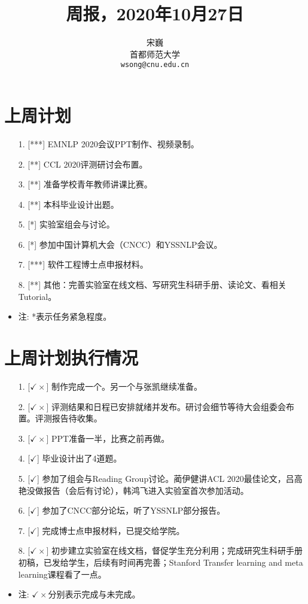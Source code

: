 \documentclass[11pt]{article}
\title{周报，2020年10月27日}
\author{宋巍 \\
  首都师范大学 \\
    {\tt wsong@cnu.edu.cn}}
\date{}
\begin{document}
\begin{CJK}{UTF8}{gkai}

\maketitle
\CJKindent


\section{上周计划}


\begin{itemize}
\item [1.] [***] EMNLP 2020会议PPT制作、视频录制。
\item [2.] [**] CCL 2020评测研讨会布置。
\item [3.] [**] 准备学校青年教师讲课比赛。
\item [4.] [**] 本科毕业设计出题。
\item [5.] [*] 实验室组会与讨论。
\item [6.] [*] 参加中国计算机大会（CNCC）和YSSNLP会议。
\item [7.] [***] 软件工程博士点申报材料。
\item [8.] [**] 其他：完善实验室在线文档、写研究生科研手册、读论文、看相关Tutorial。
\item 注: *表示任务紧急程度。
\end{itemize}



\section{上周计划执行情况}
\begin{itemize}
\item [1.] [$\checkmark \times$] 制作完成一个。另一个与张凯继续准备。
\item [2.] [$\checkmark \times$] 评测结果和日程已安排就绪并发布。研讨会细节等待大会组委会布置。评测报告待收集。
\item [3.] [$\checkmark \times$] PPT准备一半，比赛之前再做。
\item [4.] [$\checkmark$] 毕业设计出了4道题。
\item [5.] [$\checkmark $] 参加了组会与Reading Group讨论。蔺伊健讲ACL 2020最佳论文，吕高艳没做报告（会后有讨论），韩鸿飞进入实验室首次参加活动。
\item [6.] [$\checkmark$] 参加了CNCC部分论坛，听了YSSNLP部分报告。
\item [7.] [$\checkmark$] 完成博士点申报材料，已提交给学院。
\item [8.] [$\checkmark \times$] 初步建立实验室在线文档，督促学生充分利用；完成研究生科研手册初稿，已发给学生，后续有时间再完善；Stanford Transfer learning and meta learning课程看了一点。
\item 注: $\checkmark \times$分别表示完成与未完成。
\end{itemize}


\end{CJK}
\end{document}
